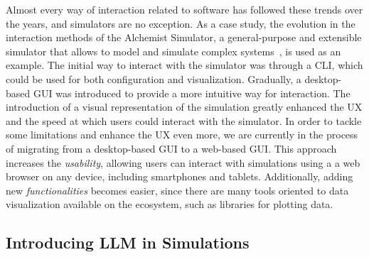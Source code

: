 \documentclass[conference]{IEEEtran}
\begin{document}
Almost every way of interaction related to software has followed these trends over the years,
and simulators are no exception.
%
As a case study,
the evolution in the interaction methods of the Alchemist Simulator,
a general-purpose and extensible simulator that allows to model and simulate complex systems~\cite{Pianini_2013},
is used as an example.
%
The initial way to interact with the simulator was through a \ac{CLI},
which could be used for both configuration and visualization.
%
Gradually,
a desktop-based \ac{GUI} was introduced to provide a more intuitive way for interaction.
%
The introduction of a visual representation of the simulation greatly enhanced the \ac{UX} and the speed at which users could interact with the simulator.
%
In order to tackle some limitations and enhance the \ac{UX} even more,
we are currently in the process of migrating from a desktop-based \ac{GUI} to a web-based \ac{GUI}.
%
This approach increases the \emph{usability},
allowing users can interact with simulations using a a web browser on any device,
including smartphones and tablets.
%
Additionally,
adding new \emph{functionalities} becomes easier,
since there are many tools oriented to data visualization available on the ecosystem,
such as libraries for plotting data.
%

\subsection{Introducing \ac{LLM} in Simulations}
\end{document}
